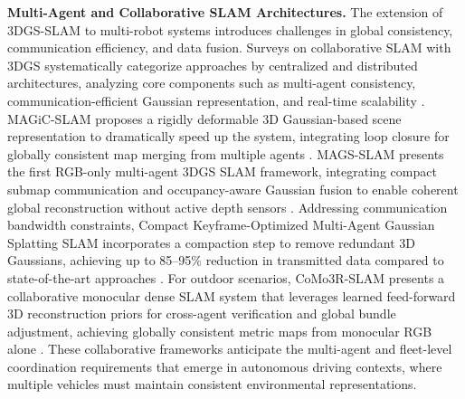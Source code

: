 \documentclass[11pt]{article}
\begin{document}
\textbf{Multi-Agent and Collaborative SLAM Architectures.} The extension of 3DGS-SLAM to multi-robot systems introduces challenges in global consistency, communication efficiency, and data fusion. Surveys on collaborative SLAM with 3DGS systematically categorize approaches by centralized and distributed architectures, analyzing core components such as multi-agent consistency, communication-efficient Gaussian representation, and real-time scalability \cite{ref646}. MAGiC-SLAM proposes a rigidly deformable 3D Gaussian-based scene representation to dramatically speed up the system, integrating loop closure for globally consistent map merging from multiple agents \cite{ref647}. MAGS-SLAM presents the first RGB-only multi-agent 3DGS SLAM framework, integrating compact submap communication and occupancy-aware Gaussian fusion to enable coherent global reconstruction without active depth sensors \cite{ref648}. Addressing communication bandwidth constraints, Compact Keyframe-Optimized Multi-Agent Gaussian Splatting SLAM incorporates a compaction step to remove redundant 3D Gaussians, achieving up to 85--95\% reduction in transmitted data compared to state-of-the-art approaches \cite{ref649}. For outdoor scenarios, CoMo3R-SLAM presents a collaborative monocular dense SLAM system that leverages learned feed-forward 3D reconstruction priors for cross-agent verification and global bundle adjustment, achieving globally consistent metric maps from monocular RGB alone \cite{ref650}. These collaborative frameworks anticipate the multi-agent and fleet-level coordination requirements that emerge in autonomous driving contexts, where multiple vehicles must maintain consistent environmental representations.
\end{document}
